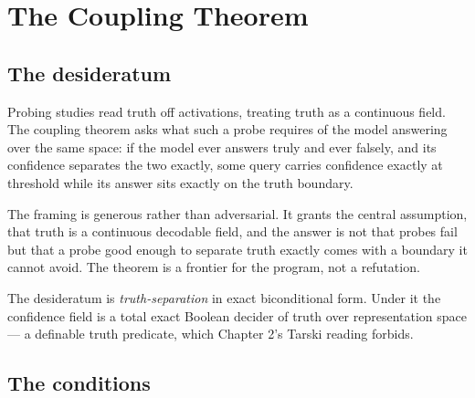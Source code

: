 \documentclass{memoir}
\begin{document}
\section{The Coupling Theorem}\label{Two--Schemas--of--Impossibility-005F-005F-005F--Machine--Checked--Limits--of--Trustworthy--Machine--Learning-005F-005F-005F--and--Why--They--Tighten--with--Capability----Three--Trilemmata-005F-005F-005F--One--Theorem----The--Coupling--Theorem}



\subsection{The desideratum}\label{Two--Schemas--of--Impossibility-005F-005F-005F--Machine--Checked--Limits--of--Trustworthy--Machine--Learning-005F-005F-005F--and--Why--They--Tighten--with--Capability----Three--Trilemmata-005F-005F-005F--One--Theorem----The--Coupling--Theorem----The--desideratum}

Probing studies read truth off activations, treating truth as a continuous
field. The coupling theorem asks what such a probe requires of the model
answering over the same space: if the model ever answers truly and ever falsely,
and its confidence separates the two exactly, some query carries confidence
exactly at threshold while its answer sits exactly on the truth boundary.

The framing is generous rather than adversarial. It grants the central
assumption, that truth is a continuous decodable field, and the answer is not
that probes fail but that a probe good enough to separate truth exactly comes
with a boundary it cannot avoid. The theorem is a frontier for the program, not
a refutation.

The desideratum is \emph{truth-separation} in exact biconditional form. Under it the
confidence field is a total exact Boolean decider of truth over representation
space — a definable truth predicate, which Chapter 2's Tarski reading forbids.



\subsection{The conditions}\label{Two--Schemas--of--Impossibility-005F-005F-005F--Machine--Checked--Limits--of--Trustworthy--Machine--Learning-005F-005F-005F--and--Why--They--Tighten--with--Capability----Three--Trilemmata-005F-005F-005F--One--Theorem----The--Coupling--Theorem----The--conditions}
\end{document}
